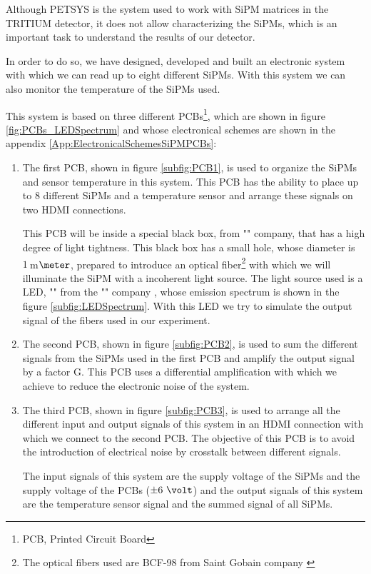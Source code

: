Although PETSYS is the system used to work with SiPM matrices in the TRITIUM detector, it does not allow characterizing the SiPMs, which is an important task to understand the results of our detector.

In order to do so, we have designed, developed and built an electronic system with which we can read up to eight different SiPMs. With this system we can also monitor the temperature of the SiPMs used.

This system is based on three different PCBs\footnote{PCB, Printed Circuit Board}, which are shown in figure \ref{fig:PCBs_LEDSpectrum} and whose electronical schemes are shown in the appendix \ref{App:ElectronicalSchemesSiPMPCBs}:

\begin{enumerate}
\item{} The first PCB, shown in figure \ref{subfig:PCB1}, is used to organize the SiPMs and sensor temperature in this system. This PCB has the ability to place up to 8 different SiPMs and a temperature sensor and arrange these signals on two HDMI connections.

This PCB will be inside a special black box, from "" company, that has a high degree of light tightness. This black box has a small hole, whose diameter is $1~$m$\meter$, prepared to introduce an optical fiber\footnote{The optical fibers used are BCF-98 from Saint Gobain company \cite{OpticalFibers}} with which we will illuminate the SiPM with a incoherent light source. The light source used is a LED, "" from the "" company \cite{}, whose emission spectrum is shown in the figure \ref{subfig:LEDSpectrum}. With this LED we try to simulate the output signal of the fibers used in our experiment.

\item{} The second PCB, shown in figure \ref{subfig:PCB2}, is used to sum the different signals from the SiPMs used in the first PCB and amplify the output signal by a factor G. This PCB uses a differential amplification with which we achieve to reduce the electronic noise of the system.

\item{} The third PCB, shown in figure \ref{subfig:PCB3}, is used to arrange all the different input and output signals of this system in an HDMI connection with which we connect to the second PCB. The objective of this PCB is to avoid the introduction of electrical noise by crosstalk between different signals.

The input signals of this system are the supply voltage of the SiPMs and the supply voltage of the PCBs ($\pm 6~\volt$) and the output signals of this system are the temperature sensor signal and the summed signal of all SiPMs. 

\end{enumerate}

